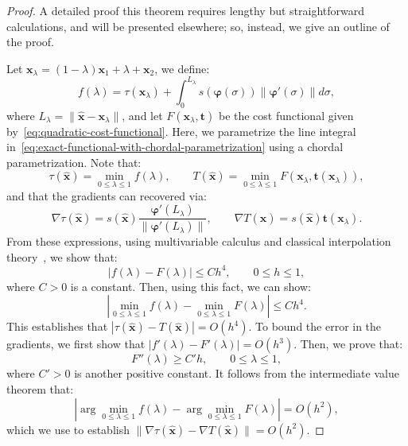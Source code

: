 \documentclass{siamart190516}
\renewcommand{\phi}{\varphi}
\newcommand{\m}[1]{\boldsymbol{#1}}
\newcommand{\xhat}{\hat{\m{x}}}
\newcommand{\mphi}{\m{\phi}}
\DeclareMathOperator{\Arg}{arg}
\begin{document}
\begin{proof}
  A detailed proof this theorem requires lengthy but straightforward
  calculations, and will be presented elsewhere; so, instead, we give
  an outline of the proof.

  Let $\m{x}_{\lambda} = (1 - \lambda) \m{x}_1 + \lambda + \m{x}_2$,
  we define:
  \begin{equation}\label{eq:exact-functional-with-chordal-parametrization}
    f(\lambda) = \tau(\m{x}_{\lambda}) + \int_0^{L_\lambda} s(\mphi(\sigma)) \|\mphi'(\sigma)\| d\sigma,
  \end{equation}
  where $L_\lambda = \|\xhat - \m{x}_\lambda\|$, and let
  $F(\m{x}_{\lambda}, \m{t})$ be the cost functional given
  by~\eqref{eq:quadratic-cost-functional}. Here, we parametrize the
  line integral
  in~\eqref{eq:exact-functional-with-chordal-parametrization} using a
  chordal parametrization. Note that:
  \begin{equation}
    \tau(\xhat) = \min_{0 \leq \lambda \leq 1} f(\lambda), \qquad T(\xhat) = \min_{0 \leq \lambda \leq 1} F(\m{x}_\lambda, \m{t}(\m{x}_\lambda)),
  \end{equation}
  and that the  gradients can recovered via:
  \begin{equation}
    \nabla \tau(\xhat) = s(\xhat) \frac{\mphi'(L_\lambda)}{\|\mphi'(L_\lambda)\|}, \qquad \nabla T(\xhat) = s(\xhat) \m{t}(\m{x}_\lambda).
  \end{equation}
  From these expressions, using multivariable calculus and classical
  interpolation theory~\cite{Stoer:2013aa}, we show that:
  \begin{equation}
    |f(\lambda) - F(\lambda)| \leq Ch^4, \qquad 0 \leq h \leq 1,
  \end{equation}
  where $C > 0$ is a constant. Then, using this fact, we can show:
  \begin{equation}
    \left|\min_{0\leq\lambda\leq1} f(\lambda) - \min_{0\leq\lambda\leq1} F(\lambda)\right| \leq Ch^4.
  \end{equation}
  This establishes that $|\tau(\xhat) - T(\xhat)| = O(h^4)$. To bound
  the error in the gradients, we first show that
  $|f'(\lambda) - F'(\lambda)| = O(h^3)$. Then, we prove that:
  \begin{equation}
    F''(\lambda) \geq C'h, \qquad 0 \leq \lambda \leq 1,
  \end{equation}
  where $C' > 0$ is another positive constant. It follows from the
  intermediate value theorem that:
  \begin{equation}
    \left|\Arg\min_{0\leq\lambda\leq1}f(\lambda) - \Arg\min_{0\leq\lambda\leq1}F(\lambda)\right| = O(h^2),
  \end{equation}
  which we use to establish
  $\|\nabla \tau(\xhat) - \nabla T(\xhat)\| = O(h^2)$.
\end{proof}
\end{document}
